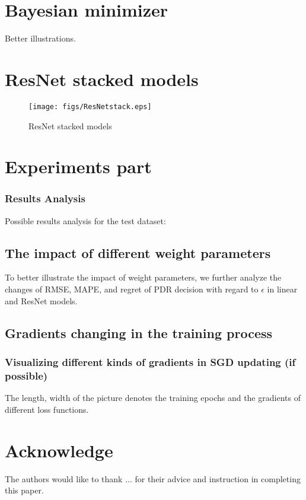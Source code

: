 \documentclass[journal]{IEEEtran}
\begin{document}
\section{Bayesian minimizer}
Better illustrations.

\section{ResNet stacked models}


\begin{figure}[h]
  \centering
  \texttt{[image: figs/ResNetstack.eps]}
  \caption{ResNet stacked models}
  \label{ResNetstack}
\end{figure}

\section{Experiments part}
\subsubsection{Results Analysis}
Possible results analysis for the test dataset:

\subsection{The impact of different weight parameters}

To better illustrate the impact of weight parameters, we further analyze the changes of RMSE, MAPE, and regret of PDR decision with regard to $\epsilon$ in linear and ResNet models.

\subsection{Gradients changing in the training process}


\subsubsection{Visualizing different kinds of gradients in SGD updating (if possible)} 
The length, width of the picture denotes the training epochs and the gradients of different loss functions.





\section*{Acknowledge}
The authors would like to thank ... for their advice and instruction in completing this paper.
\end{document}
